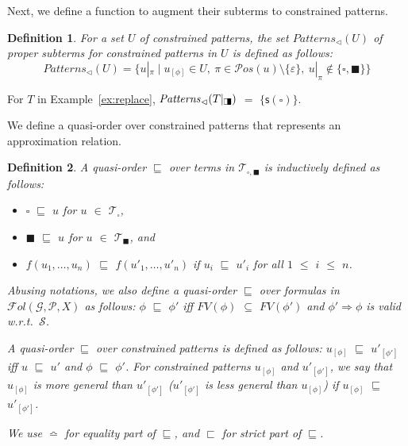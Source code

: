\documentclass[copyright,creativecommons]{eptcs}
\newtheorem{definition}{Definition}
\newcommand{\cG}{\mathcal{G}}
\newcommand{\cP}{\mathcal{P}}
\newcommand{\cS}{\mathcal{S}}
\newcommand{\FVar}{{\mathit{FV}}}
\newcommand{\Pos}{{\mathcal{P}os}}
\newcommand{\Terms}{{\mathcal{T}}}
\newcommand{\TwC}[2]{{#1}_{[#2]}}
\newcommand{\Fol}{{\mathcal{F}\!\mathit{ol}}}
\newcommand{\Bothsquares}{\scalebox{.5}[.8]{$\square\!\blacksquare$}}
\newcommand{\Replace}[1]{{#1}|_{\Bothsquares}}
\newcommand{\Subpatterns}{{\mathit{Patterns}_{\lhd}}}
\begin{document}
Next, we define a function to augment their subterms to constrained patterns. 
\begin{definition}
For a set $U$ of constrained patterns, 
the set $\Subpatterns(U)$ of proper subterms for constrained patterns in
 $U$ is defined as follows: 
\[
 \Subpatterns(U) =
 \{ u|_\pi \mid \TwC{u}{\phi} \in U,
 ~ \pi \in \Pos(u) \setminus \{ \varepsilon \}, ~ u|_\pi \not\in \{\square,\blacksquare\} \}
\]
\end{definition}
\begin{example}
For $T$ in Example~\ref{ex:replace}, 
$\Subpatterns(\Replace{T})$
$=$ $\{ \mathsf{s}(\square) \}$.
\end{example}

We define a quasi-order over constrained patterns 
that represents an approximation relation.
\begin{definition}
 \label{sqsubseteq}
 A quasi-order $\sqsubseteq$ over terms in
 $\Terms_{\square,\blacksquare}$ is inductively defined as
 follows: 
 \begin{itemize}
  \item $\square$ $\sqsubseteq$ $u$ for $u$ $\in$
	$\Terms_\square$,
  \item $\blacksquare$ $\sqsubseteq$ $u$ for $u$ $\in$
	$\Terms_\blacksquare$, and
  \item $f(u_1,\ldots,u_n)$ $\sqsubseteq$ $f(u'_1,\ldots,u'_n)$ if $u_i$
       $\sqsubseteq$ $u'_i$ for all $1$ $\leq$ $i$ $\leq$ $n$.
 \end{itemize}


Abusing notations, we also define a quasi-order $\sqsubseteq$ over
 formulas in $\Fol(\cG,\cP,X)$ as follows:
$\phi$ $\sqsubseteq$ $\phi'$
iff $\FVar(\phi)$ $\subseteq$ $\FVar(\phi')$ and $\phi' \Rightarrow
 \phi$ is valid w.r.t.\ $\cS$.


A quasi-order $\sqsubseteq$ over constrained patterns is defined as
 follows:
 $\TwC{u}{\phi}$ $\sqsubseteq$ $\TwC{u'}{\phi'}$
 iff $u$ $\sqsubseteq$ $u'$ and $\phi$ $\sqsubseteq$ $\phi'$.
For constrained patterns $\TwC{u}{\phi}$ and $\TwC{u'}{\phi'}$, we say
 that $\TwC{u}{\phi}$ is \emph{more general} than $\TwC{u'}{\phi'}$
 ($\TwC{u'}{\phi'}$ is \emph{less general} than $\TwC{u}{\phi}$) if
 $\TwC{u}{\phi}$ $\sqsubseteq$ $\TwC{u'}{\phi'}$. 

We use $\bumpeq$ for equality part of $\sqsubseteq$, and
$\sqsubset$ for strict part of $\sqsubseteq$.
\end{definition}
\end{document}
